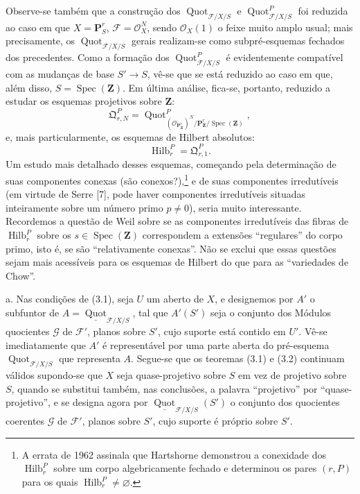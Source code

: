  Observe-se também que a construção dos
$\operatorname{Quot}_{\mathcal F/X/S}$ e
$\operatorname{Quot}^P_{\mathcal F/X/S}$ foi reduzida ao caso em que
$X=\mathbf P^r_S$, $\mathcal F=\mathcal O_X^N$, sendo $\mathcal O_X(1)$ o
feixe muito amplo usual; mais precisamente, os
$\operatorname{Quot}_{\mathcal F/X/S}$ gerais realizam-se como
subpré-esquemas fechados dos precedentes. Como a formação dos
$\operatorname{Quot}^P_{\mathcal F/X/S}$ é evidentemente compatível com as
mudanças de base $S'\longrightarrow S$, vê-se que se está reduzido ao caso em
que, além disso, $S=\operatorname{Spec}(\mathbf Z)$. Em última análise, fica-se,
portanto, reduzido a estudar os esquemas projetivos sobre $\mathbf Z$:
\[
\mathfrak Q^P_{r,N}=
\operatorname{Quot}^{P}_{(\mathcal O_{\mathbf P^r_{\mathbf Z}})^N/
\mathbf P^r_{\mathbf Z}/\operatorname{Spec}(\mathbf Z)},
\]
e, mais particularmente, os esquemas de Hilbert absolutos:
\[
\operatorname{Hilb}^P_r=\mathfrak Q^P_{r,1}.
\]
Um estudo mais detalhado desses esquemas, começando pela determinação de suas
componentes conexas (são conexos?),\footnote{A errata de 1962 assinala que
Hartshorne demonstrou a conexidade dos $\operatorname{Hilb}^P_r$ sobre um
corpo algebricamente fechado e determinou os pares $(r,P)$ para os quais
$\operatorname{Hilb}^P_r\neq\varnothing$.} e de suas componentes irredutíveis
(em virtude de Serre [7], pode haver componentes irredutíveis situadas
inteiramente sobre um número primo $p\neq0$), seria muito interessante.
Recordemos a questão de Weil sobre se as componentes irredutíveis das fibras de
$\operatorname{Hilb}^P_r$ sobre os $s\in\operatorname{Spec}(\mathbf Z)$
correspondem a extensões ``regulares'' do corpo primo, isto é, se são
``relativamente conexas''. Não se exclui que essas questões sejam mais
acessíveis para os esquemas de Hilbert do que para as ``variedades de Chow''.


\noindent a. Nas condições de (3.1), seja $U$ um aberto de $X$, e designemos
por $A'$ o subfuntor de
$A=\underline{\operatorname{Quot}}_{\mathcal F/X/S}$, tal que $A'(S')$ seja
o conjunto dos Módulos quocientes $\mathcal G$ de $\mathcal F'$, planos sobre
$S'$, cujo suporte está contido em $U'$. Vê-se imediatamente que $A'$ é
representável por uma parte aberta do pré-esquema
$\operatorname{Quot}_{\mathcal F/X/S}$ que representa $A$. Segue-se que os
teoremas (3.1) e (3.2)
continuam válidos supondo-se que $X$ seja quase-projetivo sobre $S$ em vez de
projetivo sobre $S$, quando se substitui também, nas conclusões, a palavra
``projetivo'' por ``quase-projetivo'', e se designa agora por
$\underline{\operatorname{Quot}}_{\mathcal F/X/S}(S')$ o conjunto dos
quocientes coerentes $\mathcal G$ de $\mathcal F'$, planos sobre $S'$, cujo
suporte é próprio sobre $S'$.

